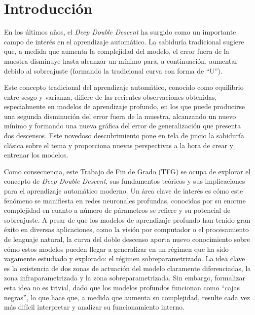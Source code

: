 %


\chapter{Introducción}

En los últimos años, el \emph{Deep Double Descent} ha surgido como un importante campo de interés en el aprendizaje automático. La sabiduría tradicional sugiere que, a medida que aumenta la complejidad del modelo, el error fuera de la muestra disminuye hasta alcanzar un mínimo para, a continuación, aumentar debido al sobreajuste (formando la tradicional curva con forma de ``U'').\newline

Este concepto tradicional del aprendizaje automático, conocido como equilibrio entre sesgo y varianza, difiere de las recientes observaciones obtenidas, especialmente en modelos de aprendizaje profundo, en los que puede producirse una segunda disminución del error fuera de la muestra, alcanzando un nuevo mínimo y formando una nueva gráfica del error de generalización que presenta dos descensos. Este novedoso descubrimiento pone en tela de juicio la sabiduría clásica sobre el tema y proporciona nuevas perspectivas a la hora de crear y entrenar los modelos.\newline

Como consecuencia, este Trabajo de Fin de Grado (TFG) se ocupa de explorar el concepto de \emph{Deep Double Descent}, sus fundamentos teóricos y sus implicaciones para el aprendizaje automático moderno. Un área clave de interés es cómo este fenómeno se manifiesta en redes neuronales profundas, conocidas por su enorme complejidad en cuanto a número de párametros se refiere y su potencial de sobreajuste. A pesar de que los modelos de aprendizaje profundo han tenido gran éxito en diversas aplicaciones, como la visión por computador o el procesamiento de lenguaje natural, la curva del doble descenso aporta nuevo conocimiento sobre cómo estos modelos pueden llegar a generalizar en un régimen que ha sido vagamente estudiado y explorado: el régimen sobreparametrizado. La idea clave es la existencia de dos zonas de actuación del modelo claramente diferenciadas, la zona infraparametrizada y la zona sobreparametrizada. Sin embargo, formalizar esta idea no es trivial, dado que los modelos profundos funcionan como ``cajas negras'', lo que hace que, a medida que aumenta su complejidad, resulte cada vez más difícil interpretar y analizar su funcionamiento interno.\newline

